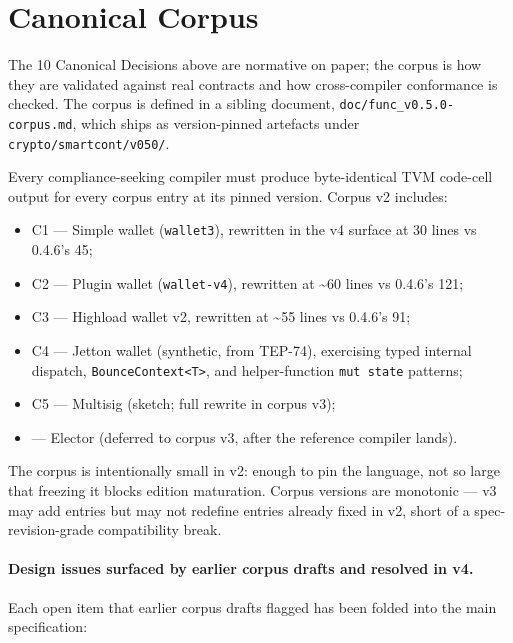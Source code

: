 \documentclass[12pt,oneside]{article}
\begin{document}
\section{Canonical Corpus}
\label{sec:canonical-corpus}
The 10 Canonical Decisions above are normative on paper; the corpus is how
they are validated against real contracts and how cross-compiler conformance
is checked. The corpus is defined in a sibling document,
\verb|doc/func_v0.5.0-corpus.md|, which ships as version-pinned artefacts
under \verb|crypto/smartcont/v050/|.

Every compliance-seeking compiler must produce byte-identical TVM code-cell
output for every corpus entry at its pinned version. Corpus v2 includes:

\begin{itemize}
\item C1 --- Simple wallet (\verb|wallet3|), rewritten in the v4 surface
at 30 lines vs 0.4.6's 45;
\item C2 --- Plugin wallet (\verb|wallet-v4|), rewritten at \textasciitilde 60
lines vs 0.4.6's 121;
\item C3 --- Highload wallet v2, rewritten at \textasciitilde 55 lines vs
0.4.6's 91;
\item C4 --- Jetton wallet (synthetic, from TEP-74), exercising typed
internal dispatch, \verb|BounceContext<T>|, and helper-function
\verb|mut state| patterns;
\item C5 --- Multisig (sketch; full rewrite in corpus v3);
\item --- Elector (deferred to corpus v3, after the reference compiler
lands).
\end{itemize}

The corpus is intentionally small in v2: enough to pin the language, not so
large that freezing it blocks edition maturation. Corpus versions are
monotonic --- v3 may add entries but may not redefine entries already fixed
in v2, short of a spec-revision-grade compatibility break.

\paragraph{Design issues surfaced by earlier corpus drafts and resolved in v4.}
Each open item that earlier corpus drafts flagged has been folded into
the main specification:
\end{document}
